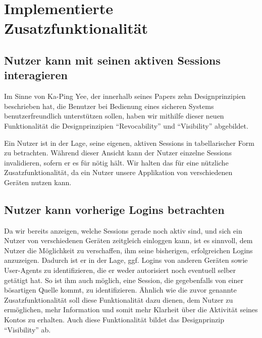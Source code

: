 \documentclass[12pt,DIV14,BCOR10mm,a4paper,parskip=half-,headsepline,headinclude,english,ngerman,bibliography=totocnumbered]{scrreprt}
\begin{document}



\chapter{Implementierte Zusatzfunktionalität}

\section{Nutzer kann mit seinen aktiven Sessions interagieren}

Im Sinne von Ka-Ping Yee, der innerhalb seines Papers  \autocite{Yee.UserInteraction} zehn Designprinzipien beschrieben hat, die Benutzer bei Bedienung eines sicheren Systems benutzerfreundlich unterstützen sollen, haben wir mithilfe dieser neuen Funktionalität die Designprinzipien \enquote{Revocability} und \enquote{Visibility} abgebildet. \par
Ein Nutzer ist in der Lage, seine eigenen, aktiven Sessions in tabellarischer Form zu betrachten.
Während dieser Ansicht kann der Nutzer einzelne Sessions invalidieren, sofern er es für nötig hält.
Wir halten das für eine nützliche Zusatzfunktionalität, da ein Nutzer unsere Applikation von verschiedenen Geräten nutzen kann.

\section{Nutzer kann vorherige Logins betrachten}

Da wir bereits anzeigen, welche Sessions gerade noch aktiv sind, und sich ein Nutzer von verschiedenen Geräten zeitgleich einloggen kann, ist es sinnvoll, dem Nutzer die Möglichkeit zu verschaffen, ihm seine bisherigen, erfolgreichen Logins anzuzeigen.
Dadurch ist er in der Lage, ggf. Logins von anderen Geräten sowie User-Agents zu identifizieren, die er weder autorisiert noch eventuell selber getätigt hat.
So ist ihm auch möglich, eine Session, die gegebenfalls von einer bösartigen Quelle kommt, zu identifizieren.
Ähnlich wie die zuvor genannte Zusatzfunktionalität soll diese Funktionalität dazu dienen, dem Nutzer zu ermöglichen, mehr Information und somit mehr Klarheit über die Aktivität seines Kontos zu erhalten.
Auch diese Funktionalität bildet das Designprinzip \enquote{Visibility} ab.
\end{document}
